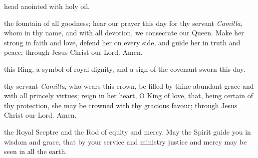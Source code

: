 {




 head anointed with holy oil.

\vfill 



 the fountain of all goodness;
hear our prayer this day for thy servant \textit{Camilla},
whom in thy name, and with all devotion,
we consecrate our Queen.
Make her strong in faith and love,
defend her on every side,
and guide her in truth and peace;
through Jesus Christ our Lord. Amen.


\vfill 





 this Ring, a symbol of royal dignity, and a sign of the covenant
sworn this day.


\clearpage
{}



 thy servant \textit{Camilla}, who wears this crown, be filled by thine abundant
grace and with all princely virtues; reign in her heart, O King of love, that,
being certain of thy protection, she may be crowned with thy gracious
favour; through Jesus Christ our Lord. Amen.

\vfill 






 the Royal Sceptre and the Rod of equity and mercy. May the Spirit
guide you in wisdom and grace, that by your service and ministry justice
and mercy may be seen in all the earth.

}
